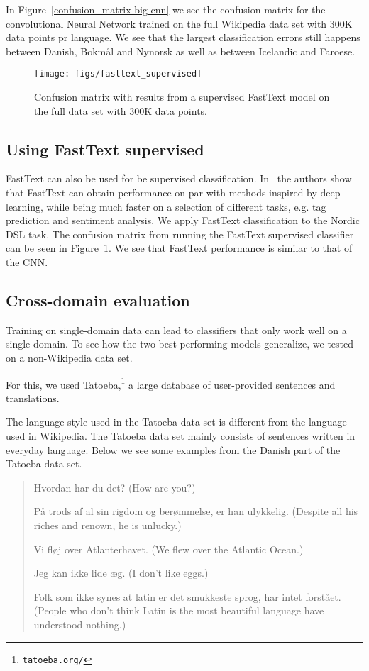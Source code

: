 \documentclass[11pt,a4paper]{article}
\begin{document}
In Figure~\ref{confusion_matrix-big-cnn} we see the confusion matrix for the convolutional Neural Network trained on the full Wikipedia data set with 300K data points pr language. We see that the largest classification errors still happens between Danish, Bokmål and Nynorsk as well as between Icelandic and Faroese.


\begin{figure}
  \centering
  \texttt{[image: figs/fasttext\_supervised]}
  \caption{Confusion matrix with results from a supervised FastText model on the full data set with 300K data points.}
  \label{fasttext_supervised}
\end{figure}

\subsection{Using FastText supervised}

FastText can also be used for be supervised classification. In~ the authors show that FastText can obtain performance on par with methods inspired by deep learning, while being much faster on a selection of different tasks, e.g. tag prediction and sentiment analysis. We apply FastText classification to the Nordic DSL task. The confusion matrix from running the FastText supervised classifier can be seen in Figure~\ref{fasttext_supervised}. We see that FastText performance is similar to that of the CNN.


\subsection{Cross-domain evaluation}



Training on single-domain data can lead to classifiers that only work well on a single domain. To see how the two best performing models generalize, we tested on a non-Wikipedia data set.

For this, we used Tatoeba,\footnote{{\tt tatoeba.org/}} a large database of user-provided sentences and translations. 

The language style used in the Tatoeba data set is different from the language used in Wikipedia. The Tatoeba data set mainly consists of sentences written in everyday language. Below we see some examples from the Danish part of the Tatoeba data set.

\begin{quote}
Hvordan har du det? (How are you?)

På trods af al sin rigdom og berømmelse, er han ulykkelig. (Despite all his riches and renown, he is unlucky.)

Vi fløj over Atlanterhavet. (We flew over the Atlantic Ocean.)

Jeg kan ikke lide æg. (I don't like eggs.)

Folk som ikke synes at latin er det smukkeste sprog, har intet forstået. (People who don't think Latin is the most beautiful language have understood nothing.)
\end{quote}
\end{document}
